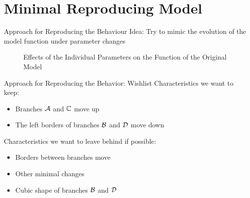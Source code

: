 
\section{Minimal Reproducing Model}

\begin{frame}{Approach for Reproducing the Behaviour}
	Idea:
	Try to mimic the evolution of the model function under parameter changes

	\vspace{-2.0em}
	\begin{figure}
		\centering
		\caption{Effects of the Individual Parameters on the Function of the Original Model}
	\end{figure}
\end{frame}

\begin{frame}{Approach for Reproducing the Behavior: Wishlist}
	Characteristics we want to keep:
	\begin{itemize}
		\item Branches $\mathcal{A}$ and $\mathbb{C}$ move up
		\item The left borders of branches $\mathcal{B}$ and $\mathcal{D}$ move down
	\end{itemize}

	\vspace{2em}
	Characteristics we want to leave behind if possible:
	\begin{itemize}
		\item Borders between branches move
		\item Other minimal changes
		\item Cubic shape of branches $\mathcal{B}$ and $\mathcal{D}$
	\end{itemize}
\end{frame}

